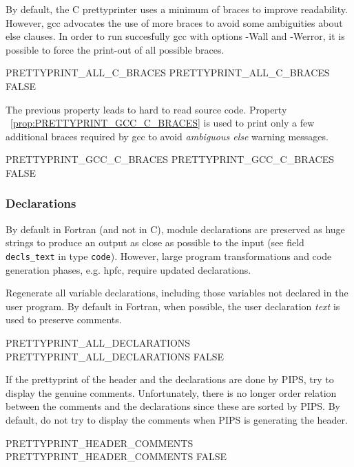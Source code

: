 \documentclass[a4paper]{report}
\newcommand{\PipsPropRef}[1]{\texttt{\detokenize{#1}}~\ref{prop:#1}}
\begin{document}
By default, the C prettyprinter uses a minimum of braces to improve
readability. However, gcc advocates the use of more braces to avoid
some ambiguities about else clauses. In order to run succesfully gcc
with options -Wall and -Werror, it is possible to force the print-out
of all possible braces.

\begin{PipsProp}{PRETTYPRINT_ALL_C_BRACES}
PRETTYPRINT_ALL_C_BRACES FALSE
\end{PipsProp}

The previous property leads to hard to read source code. Property
\PipsPropRef{PRETTYPRINT_GCC_C_BRACES} is used to print only a few
additional braces required by gcc to avoid {\em ambiguous else}
warning messages.

\begin{PipsProp}{PRETTYPRINT_GCC_C_BRACES}
PRETTYPRINT_GCC_C_BRACES FALSE
\end{PipsProp}

\subsubsection{Declarations}
\label{subsubsection-declarations}

By default in Fortran (and not in C), module declarations are preserved as
huge strings to produce an output as close as possible to the input (see
field \verb/decls_text/ in type \verb/code/). However, large program
transformations and code generation phases, e.g. hpfc, require updated
declarations.

Regenerate all variable declarations, including those variables not
declared in the user program. By default in Fortran, when possible, the
user declaration {\em text} is used to preserve comments.

\begin{PipsProp}{PRETTYPRINT_ALL_DECLARATIONS}
PRETTYPRINT_ALL_DECLARATIONS FALSE
\end{PipsProp}

If the prettyprint of the header and the declarations are done by
PIPS, try to display the genuine comments. Unfortunately, there is no
longer order relation between the comments and the declarations since
these are sorted by PIPS. By default, do not try to display the
comments when PIPS is generating the header.
\begin{PipsProp}{PRETTYPRINT_HEADER_COMMENTS}
PRETTYPRINT_HEADER_COMMENTS FALSE
\end{PipsProp}
\end{document}
